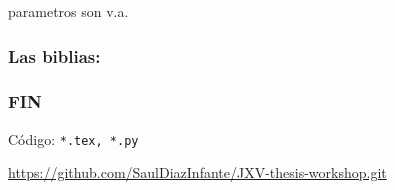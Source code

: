 \begin{frame}
\begin{textblock*}{72mm}
\begin{graybox}
{{                    parametros son v.a.
                }
            }%
          \end{graybox}
       \end{textblock*}
\end{frame}
\begin{frame}
    \frametitle{Las biblias:}
\end{frame}
\begin{frame}
    \frametitle{FIN}
    Código: \texttt{*.tex, *.py}
    \begin{center}
        \href{
            https://github.com/SaulDiazInfante/JXV-thesis-workshop.git%
        }%
        {https://github.com/SaulDiazInfante/JXV-thesis-workshop.git}
    \end{center}
\end{frame}